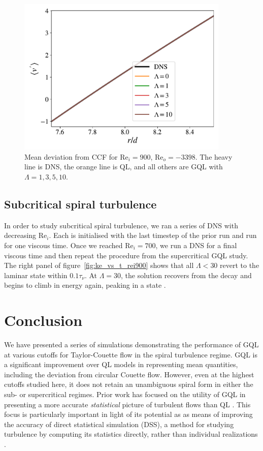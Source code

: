 \documentclass[openacc]{rstransa}%
\newcommand{\Reyn}{\mathrm{Re}}
\begin{document}
\begin{figure}
    \centering
    \includegraphics[width=0.9\textwidth]{figs/rei900_reo_-3398_vmean_profile.pdf}
    \caption{Mean deviation from CCF for $\Reyn_i = 900$, $\Reyn_o=-3398$. The heavy line is DNS, the orange line is QL, and all others are GQL with $\Lambda = 1,3,5,10$.}
    \label{fig:rei900_vmean}
\end{figure}

\subsection{Subcritical spiral turbulence}
In order to study subcritical spiral turbulence, we ran a series of DNS with decreasing $\Reyn_i$. Each is initialised with the last timestep of the prior run and run for one viscous time. Once we reached $\Reyn_i = 700$, we run a DNS for a final viscous time and then repeat the procedure from the supercritical GQL study. The right panel of figure~\ref{fig:ke_vs_t_rei900} shows  that all $\Lambda < 30$ revert to the laminar state within $0.1 \tau_\nu$. At $\Lambda = 30$, the solution recovers from the decay and begins to climb in energy again, peaking in a state .

\section{Conclusion}
\label{sec:conclusion}
We have presented a series of simulations demonstrating the performance of GQL at various cutoffs for Taylor-Couette flow in the spiral turbulence regime. GQL is a significant improvement over QL models in representing mean quantities, including the deviation from circular Couette flow. However, even at the highest cutoffs studied here, it does not retain an unambiguous spiral form in either the sub- or supercritical regimes. Prior work has focused on the utility of GQL in presenting a more accurate \emph{statistical} picture of turbulent flows than QL \cite{2016PhRvL.116u4501M, 2017JFM...810..412T,2018RSPSA.47480422T,2019Kellam}. This focus is particularly important in light of its potential as as means of improving the accuracy of direct statistical simulation (DSS), a method for studying turbulence by computing its statistics directly, rather than individual realizations \cite{2022arXiv220505513M}. 
\end{document}
